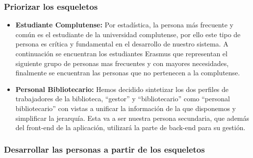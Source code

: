 \documentclass[12pt]{article}
\begin{document}
\begin{itemize}
\subsubsection{Priorizar los esqueletos}
\begin{itemize}
	\item \textbf{Estudiante Complutense:}
		Por estadística, la persona más frecuente y común es el estudiante de la universidad complutense, por ello este tipo de persona es crítica y fundamental en el desarrollo de nuestro sistema.
		A continuación se encuentran los estudiantes Erasmus que representan el siguiente grupo de personas mas frecuentes y con mayores necesidades, finalmente se encuentran las personas que no pertenecen a la complutense.

	\item \textbf{Personal Bibliotecario:}
		Hemos decidido sintetizar los dos perfiles de trabajadores de la biblioteca, ``gestor'' y ``bibliotecario'' como ``personal bibliotecario'' con vistas a unificar la información de la que disponemos y simplificar la jerarquía. Esta va a ser nuestra persona secundaria, que además del front-end de la aplicación, utilizará la parte de back-end para su gestión.

\end{itemize}

\newpage
\subsubsection{Desarrollar las personas a partir de los esqueletos}


\end{itemize}
\end{document}
